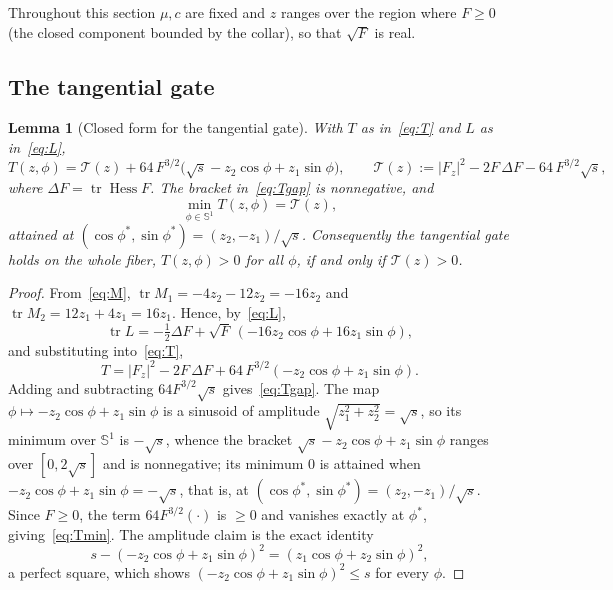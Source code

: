 \documentclass[11pt,reqno]{amsart}
\theoremstyle{plain}
\newtheorem{lemma}[theorem]{Lemma}
\theoremstyle{definition}
\DeclareMathOperator{\tr}{tr}
\DeclareMathOperator{\Hess}{Hess}
\newcommand{\Sph}{\mathbb{S}}
\newcommand{\calT}{\mathcal{T}}
\newcommand{\Fz}{F_{z}}
\begin{document}
Throughout this section $\mu,c$ are fixed and $z$ ranges over the region where $F\ge 0$ (the closed component bounded by the collar), so that $\sqrt{F}$ is real.

\subsection{The tangential gate}

\begin{lemma}[Closed form for the tangential gate]\label{lem:T}
With $T$ as in~\eqref{eq:T} and $L$ as in~\eqref{eq:L},
\begin{equation}\label{eq:Tgap}
T(z,\phi)=\calT(z)+64\,F^{3/2}\bigl(\sqrt{s}-z_2\cos\phi+z_1\sin\phi\bigr),
\qquad
\calT(z):=|\Fz|^2-2F\,\Delta F-64\,F^{3/2}\sqrt{s},
\end{equation}
where $\Delta F=\tr\Hess F$. The bracket in~\eqref{eq:Tgap} is nonnegative, and
\begin{equation}\label{eq:Tmin}
\min_{\phi\in\Sph^1} T(z,\phi)=\calT(z),
\end{equation}
attained at $(\cos\phi^\ast,\sin\phi^\ast)=(z_2,-z_1)/\sqrt{s}$. Consequently the tangential gate holds on the whole fiber, $T(z,\phi)>0$ for all $\phi$, if and only if $\calT(z)>0$.
\end{lemma}

\begin{proof}
From~\eqref{eq:M}, $\tr M_1=-4z_2-12z_2=-16z_2$ and $\tr M_2=12z_1+4z_1=16z_1$. Hence, by~\eqref{eq:L},
\[
\tr L=-\tfrac12\Delta F+\sqrt{F}\,(-16z_2\cos\phi+16z_1\sin\phi),
\]
and substituting into~\eqref{eq:T},
\[
T=|\Fz|^2-2F\,\Delta F+64\,F^{3/2}(-z_2\cos\phi+z_1\sin\phi).
\]
Adding and subtracting $64F^{3/2}\sqrt{s}$ gives~\eqref{eq:Tgap}. The map $\phi\mapsto -z_2\cos\phi+z_1\sin\phi$ is a sinusoid of amplitude $\sqrt{z_1^2+z_2^2}=\sqrt{s}$, so its minimum over $\Sph^1$ is $-\sqrt{s}$, whence the bracket $\sqrt{s}-z_2\cos\phi+z_1\sin\phi$ ranges over $[0,2\sqrt{s}]$ and is nonnegative; its minimum $0$ is attained when $-z_2\cos\phi+z_1\sin\phi=-\sqrt{s}$, that is, at $(\cos\phi^\ast,\sin\phi^\ast)=(z_2,-z_1)/\sqrt{s}$. Since $F\ge0$, the term $64F^{3/2}(\cdot)$ is $\ge0$ and vanishes exactly at $\phi^\ast$, giving~\eqref{eq:Tmin}. The amplitude claim is the exact identity
\begin{equation}\label{eq:sq}
s-(-z_2\cos\phi+z_1\sin\phi)^2=(z_1\cos\phi+z_2\sin\phi)^2,
\end{equation}
a perfect square, which shows $(-z_2\cos\phi+z_1\sin\phi)^2\le s$ for every $\phi$.
\end{proof}
\end{document}
